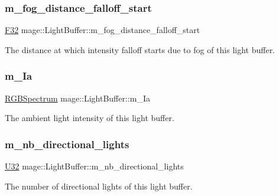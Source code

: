 \subsubsection{\texorpdfstring{m\+\_\+fog\+\_\+distance\+\_\+falloff\+\_\+start}{m\_fog\_distance\_falloff\_start}}
{\footnotesize\ttfamily \hyperlink{namespacemage_aa97e833b45f06d60a0a9c4fc22ae02c0}{F32} mage\+::\+Light\+Buffer\+::m\+\_\+fog\+\_\+distance\+\_\+falloff\+\_\+start}

The distance at which intensity falloff starts due to fog of this light buffer. \hypertarget{structmage_1_1_light_buffer_a1053a31ecdfdec2d4703376152f6defc}{}\label{structmage_1_1_light_buffer_a1053a31ecdfdec2d4703376152f6defc} 
\subsubsection{\texorpdfstring{m\+\_\+\+Ia}{m\_Ia}}
{\footnotesize\ttfamily \hyperlink{structmage_1_1_r_g_b_spectrum}{R\+G\+B\+Spectrum} mage\+::\+Light\+Buffer\+::m\+\_\+\+Ia}

The ambient light intensity of this light buffer. \hypertarget{structmage_1_1_light_buffer_a099a0307b0feacddcf01921f97752307}{}\label{structmage_1_1_light_buffer_a099a0307b0feacddcf01921f97752307} 
\subsubsection{\texorpdfstring{m\+\_\+nb\+\_\+directional\+\_\+lights}{m\_nb\_directional\_lights}}
{\footnotesize\ttfamily \hyperlink{namespacemage_a41c104c036fba3756a74e19f793eeaa1}{U32} mage\+::\+Light\+Buffer\+::m\+\_\+nb\+\_\+directional\+\_\+lights}

The number of directional lights of this light buffer. \hypertarget{structmage_1_1_light_buffer_ad576a2cf65d5c84761812144274ac779}{}\label{structmage_1_1_light_buffer_ad576a2cf65d5c84761812144274ac779} 

